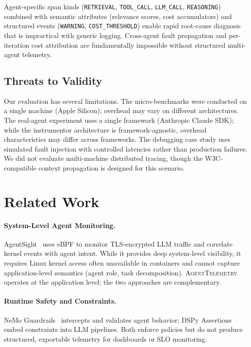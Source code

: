 \documentclass[sigplan,10pt,screen]{acmart}
\begin{document}
Agent-specific span kinds (\texttt{RETRIEVAL}, \texttt{TOOL\_\allowbreak CALL},
\texttt{LLM\_\allowbreak CALL}, \texttt{REASONING}) combined with
semantic attributes (relevance scores, cost accumulators) and
structured events (\texttt{WARNING}, \texttt{COST\_\allowbreak THRESHOLD})
enable rapid root-cause diagnosis that is impractical with generic
logging.  Cross-agent fault propagation and per-iteration cost
attribution are fundamentally impossible without structured
multi-agent telemetry.

\subsection{Threats to Validity}
\label{sec:threats}

Our evaluation has several limitations.  The micro-benchmarks were
conducted on a single machine (Apple Silicon); overhead may vary on
different architectures.  The real-agent experiment uses a single
framework (Anthropic Claude SDK); while the instrumentor architecture
is framework-agnostic, overhead characteristics may differ across
frameworks.  The debugging case study uses simulated fault injection
with controlled latencies rather than production failures.  We did not
evaluate multi-machine distributed tracing, though the W3C-compatible
context propagation is designed for this scenario.

\section{Related Work}
\label{sec:related}

\paragraph{System-Level Agent Monitoring.}
AgentSight~\cite{agentsight} uses eBPF to monitor TLS-encrypted LLM
traffic and correlate kernel events with agent intent.  While it provides
deep system-level visibility, it requires Linux kernel access often
unavailable in containers and cannot capture application-level semantics
(agent role, task decomposition).  \textsc{AgentTelemetry} operates at
the application level; the two approaches are complementary.

\paragraph{Runtime Safety and Constraints.}
NeMo Guardrails~\cite{nemo_guardrails} intercepts and validates agent
behavior; DSPy Assertions~\cite{dspy_assertions} embed constraints into
LLM pipelines.  Both enforce policies but do not produce structured,
exportable telemetry for dashboards or SLO monitoring.
\end{document}
